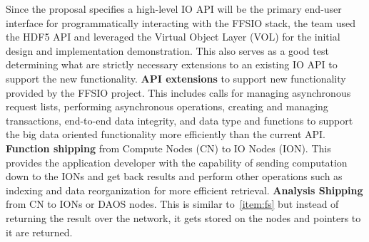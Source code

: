 \documentclass{sig-alt-gov2}
\begin{document}
Since the proposal specifies a high-level IO API will be the primary end-user
interface for programmatically interacting with the FFSIO stack, the team used
the HDF5 API and leveraged the Virtual Object Layer (VOL) for the initial
design and implementation demonstration. This also serves as a good test
determining what are strictly necessary extensions to an existing IO API to
support the new functionality.
%
%
\textbf{API extensions} to support new functionality provided by the FFSIO project.
  This includes calls for managing asynchronous request lists, performing
  asynchronous operations, creating and managing transactions, end-to-end data
  integrity, and data type and functions to support the big data oriented functionality more
  efficiently than the current API.
%
\label{item:fs}
  \textbf{Function shipping} from Compute Nodes (CN) to IO Nodes (ION). This provides
  the application developer with the capability of sending computation down to
  the IONs and get back results and perform other operations such as indexing
  and data reorganization for more efficient retrieval.
%
  \textbf{Analysis Shipping} from CN to IONs or DAOS nodes. This is similar
  to~\ref{item:fs} but instead of returning the result over the network, it
  gets stored on the nodes and pointers to it are returned.


\end{document}
